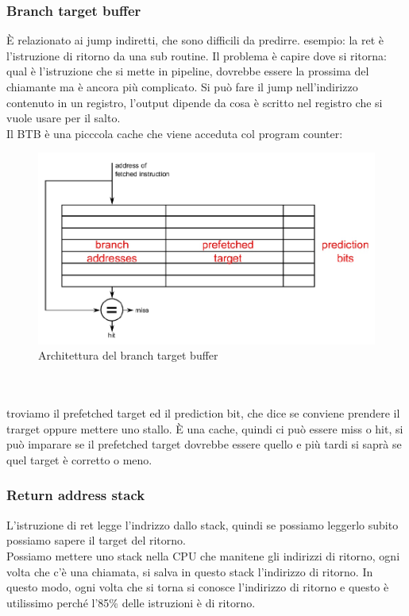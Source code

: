 \documentclass[12pt, oneside]{extbook} %
\begin{document}
\subsubsection{Branch target buffer}
È relazionato ai jump indiretti, che sono difficili da predirre. esempio: la ret è l'istruzione di ritorno da una sub routine. Il problema è capire dove si ritorna: qual è l'istruzione che si mette in pipeline, dovrebbe essere la prossima del chiamante ma è ancora più complicato. Si può fare il jump nell'indirizzo contenuto in un registro, l'output dipende da cosa è scritto nel registro che si vuole usare per il salto.\\ Il BTB è una picccola cache che viene acceduta col program counter:\\
\begin{figure}
	\includegraphics[scale=0.5]{immagini/btb.png}
	\caption{Architettura del branch target buffer}
\end{figure}\\\\
troviamo il prefetched target ed il prediction bit, che dice se conviene prendere il trarget oppure mettere uno stallo. È una cache, quindi ci può essere miss o hit, si può imparare se il prefetched target dovrebbe essere quello e più tardi si saprà se quel target è corretto o meno.

\subsubsection{Return address stack}
L'istruzione di ret legge l'indrizzo dallo stack, quindi se possiamo leggerlo subito possiamo sapere il target del ritorno.\\ Possiamo mettere uno stack nella CPU che manitene gli indirizzi di ritorno, ogni volta che c'è una chiamata, si salva in questo stack l'indirizzo di ritorno. In questo modo, ogni volta che si torna si conosce l'indirizzo di ritorno e questo è utilissimo perché l'85\% delle istruzioni è di ritorno.
\end{document}
